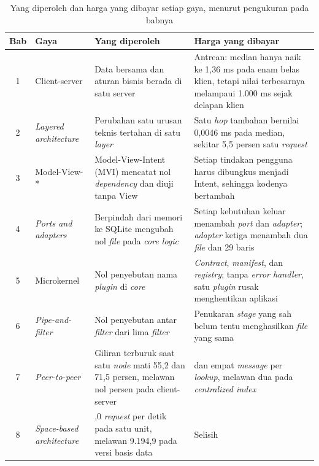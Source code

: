 \begin{table}[htbp]
  \centering
  \caption{Yang diperoleh dan harga yang dibayar setiap gaya, menurut
    pengukuran pada babnya}
  \label{tab:harga-gaya}
  \begin{tabularx}{\textwidth}{|c|>{\raggedright\arraybackslash}p{1.9cm}%
    |>{\raggedright\arraybackslash}X|>{\raggedright\arraybackslash}X|}
    \hline
    \textbf{Bab} & \textbf{Gaya} & \textbf{Yang diperoleh} &
      \textbf{Harga yang dibayar} \\
    \hline
    1 & Client-server & Data bersama dan aturan bisnis berada di satu
      server & Antrean: median hanya naik ke 1,36 ms pada enam belas klien,
      tetapi nilai terbesarnya melampaui 1.000 ms sejak delapan klien \\
    \hline
    2 & \textit{Layered architecture} & Perubahan satu urusan teknis tertahan
      di satu \textit{layer} & Satu \textit{hop} tambahan bernilai 0,0046 ms
      pada median, sekitar 5,5 persen satu \textit{request} \\
    \hline
    3 & Model-View-* & Model-View-Intent (MVI) mencatat nol \textit{dependency}
      dan diuji tanpa View & Setiap tindakan pengguna harus dibungkus menjadi
      Intent, sehingga kodenya bertambah \\
    \hline
    4 & \textit{Ports and adapters} & Berpindah dari memori ke SQLite mengubah
      nol \textit{file} pada \textit{core logic} & Setiap kebutuhan keluar
      menambah \textit{port} dan \textit{adapter}; \textit{adapter} ketiga
      menambah dua \textit{file} dan 29 baris \\
    \hline
    5 & Microkernel & Nol penyebutan nama \textit{plugin} di \textit{core} &
      \textit{Contract}, \textit{manifest}, dan \textit{registry}; tanpa
      \textit{error handler}, satu \textit{plugin} rusak menghentikan
      aplikasi \\
    \hline
    6 & \textit{Pipe-and-filter} & Nol penyebutan antar \textit{filter} dari
      lima \textit{filter} & Penukaran \textit{stage} yang sah belum tentu
      menghasilkan \textit{file} yang sama \\
    \hline
    7 & \textit{Peer-to-peer} & Giliran terburuk saat satu \textit{node} mati
      55,2 dan 71,5 persen, melawan nol persen pada client-server & 19 dan
      empat \textit{message} per \textit{lookup}, melawan dua pada
      \textit{centralized index} \\
    \hline
    8 & \textit{Space-based architecture} & 23.450,0 \textit{request} per
      detik pada satu unit, melawan 9.194,9 pada versi basis data & Selisih

\end{tabularx}
\end{table}
